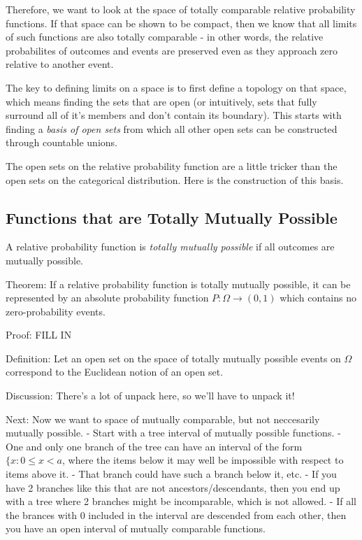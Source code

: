 \documentclass[twoside]{article}
\begin{document}
Therefore, we want to look at the space of totally comparable relative probability functions. If that space can be shown to be compact, then we know that all limits of such functions are also totally comparable - in other words, the relative probabilites of outcomes and events are preserved even as they approach zero relative to another event.

The key to defining limits on a space is to first define a topology on that space, which means finding the sets that are open (or intuitively, sets that fully surround all of it's members and don't contain its boundary). This starts with finding a \textit{basis of open sets} from which all other open sets can be constructed through countable unions.

The open sets on the relative probability function are a little tricker than the open sets on the categorical distribution. Here is the construction of this basis.

\subsection{Functions that are Totally Mutually Possible}

A relative probability function is \textit{totally mutually possible} if all outcomes are mutually possible.

Theorem: If a relative probability function is totally mutually possible, it can be represented by an absolute probability function \(P: \Omega \rightarrow (0, 1)\) which contains no zero-probability events.

Proof: FILL IN

Definition: Let an open set on the space of totally mutually possible events on \(\Omega\) correspond to the Euclidean notion of an open set.

Discussion: There's a lot of unpack here, so we'll have to unpack it!

Next: Now we want to space of mutually comparable, but not neccesarily mutually possible.
- Start with a tree interval of mutually possible functions.
- One and only one branch of the tree can have an interval of the form \(\{x: 0 \leq x < a\), where the items below it may well be impossible with respect to items above it.
- That branch could have such a branch below it, etc.
- If you have 2 branches like this that are not ancestors/descendants, then you end up with a tree where 2 branches might be incomparable, which is not allowed.
- If all the brances with 0 included in the interval are descended from each other, then you have an open interval of mutually comparable functions.
\end{document}
